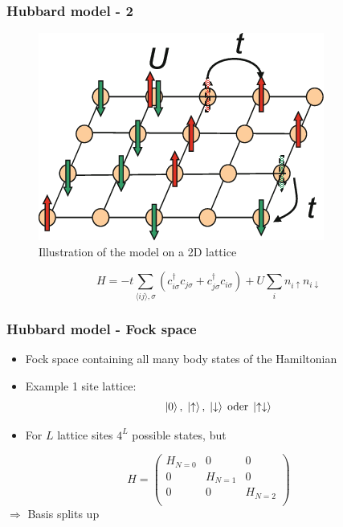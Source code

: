 \documentclass{beamer}
\begin{document}
\begin{frame}
	\frametitle{Hubbard model - 2}
	\begin{figure}[h]
		\centering
		\includegraphics[width=0.4\linewidth]{pic2}
		\caption{Illustration of the model on a 2D lattice}
		\label{fig:pic2}
	\end{figure}
	\begin{equation*}\label{Hubbard_standard}
	H = -t\sum_{\langle ij\rangle,\sigma}\left( c_{i\sigma}^\dag c_{j\sigma} + c_{j\sigma}^\dag c_{i\sigma}\right) + U \sum_{i}n_{i\uparrow}n_{i\downarrow}
	\end{equation*}
\end{frame}

\begin{frame}
\frametitle{Hubbard model - Fock space}
\begin{itemize}
\item Fock space containing all many body states of the Hamiltonian
\item Example 1 site lattice: \[ \ket{0},\; \ket{\uparrow},\; \ket{\downarrow}\; \text{oder} \; \ket{\uparrow\downarrow}\]
\item For $L$ lattice sites $ 4^L $ possible states, but
\end{itemize}
\[ H=\left( \begin{array}{ccc}
H_{N=0}  & 0 & 0\\
0 & H_{N=1} & 0\\
0 & 0 & H_{N=2}\\
\end{array}\right)  \]
$ \Rightarrow $ Basis splits up

\end{frame}

\end{document}
